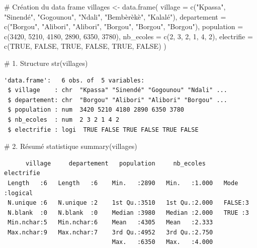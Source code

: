 \documentclass[
  french,
  11pt,
  a4paper,
]{article}
\newenvironment{Shaded}{}{}
\newcommand{\AttributeTok}[1]{\textcolor[rgb]{0.84,0.23,0.29}{#1}}
\newcommand{\CommentTok}[1]{\textcolor[rgb]{0.42,0.45,0.49}{#1}}
\newcommand{\ConstantTok}[1]{\textcolor[rgb]{0.00,0.36,0.77}{#1}}
\newcommand{\DecValTok}[1]{\textcolor[rgb]{0.00,0.36,0.77}{#1}}
\newcommand{\FunctionTok}[1]{\textcolor[rgb]{0.44,0.26,0.76}{#1}}
\newcommand{\NormalTok}[1]{\textcolor[rgb]{0.14,0.16,0.18}{#1}}
\newcommand{\OtherTok}[1]{\textcolor[rgb]{0.44,0.26,0.76}{#1}}
\newcommand{\StringTok}[1]{\textcolor[rgb]{0.01,0.18,0.38}{#1}}
\begin{document}
\begin{Shaded}
\begin{Highlighting}[]
\CommentTok{\# Création du data frame}
\NormalTok{villages }\OtherTok{\textless{}{-}} \FunctionTok{data.frame}\NormalTok{(}
  \AttributeTok{village =} \FunctionTok{c}\NormalTok{(}\StringTok{"Kpassa"}\NormalTok{, }\StringTok{"Sinendé"}\NormalTok{, }\StringTok{"Gogounou"}\NormalTok{, }\StringTok{"Ndali"}\NormalTok{, }\StringTok{"Bembèrèkè"}\NormalTok{, }\StringTok{"Kalalé"}\NormalTok{),}
  \AttributeTok{departement =} \FunctionTok{c}\NormalTok{(}\StringTok{"Borgou"}\NormalTok{, }\StringTok{"Alibori"}\NormalTok{, }\StringTok{"Alibori"}\NormalTok{, }\StringTok{"Borgou"}\NormalTok{, }\StringTok{"Borgou"}\NormalTok{, }\StringTok{"Borgou"}\NormalTok{),}
  \AttributeTok{population =} \FunctionTok{c}\NormalTok{(}\DecValTok{3420}\NormalTok{, }\DecValTok{5210}\NormalTok{, }\DecValTok{4180}\NormalTok{, }\DecValTok{2890}\NormalTok{, }\DecValTok{6350}\NormalTok{, }\DecValTok{3780}\NormalTok{),}
  \AttributeTok{nb\_ecoles =} \FunctionTok{c}\NormalTok{(}\DecValTok{2}\NormalTok{, }\DecValTok{3}\NormalTok{, }\DecValTok{2}\NormalTok{, }\DecValTok{1}\NormalTok{, }\DecValTok{4}\NormalTok{, }\DecValTok{2}\NormalTok{),}
  \AttributeTok{electrifie =} \FunctionTok{c}\NormalTok{(}\ConstantTok{TRUE}\NormalTok{, }\ConstantTok{FALSE}\NormalTok{, }\ConstantTok{TRUE}\NormalTok{, }\ConstantTok{FALSE}\NormalTok{, }\ConstantTok{TRUE}\NormalTok{, }\ConstantTok{FALSE}\NormalTok{)}
\NormalTok{)}

\CommentTok{\# 1. Structure}
\FunctionTok{str}\NormalTok{(villages)}
\end{Highlighting}
\end{Shaded}

\begin{verbatim}
'data.frame':   6 obs. of  5 variables:
 $ village    : chr  "Kpassa" "Sinendé" "Gogounou" "Ndali" ...
 $ departement: chr  "Borgou" "Alibori" "Alibori" "Borgou" ...
 $ population : num  3420 5210 4180 2890 6350 3780
 $ nb_ecoles  : num  2 3 2 1 4 2
 $ electrifie : logi  TRUE FALSE TRUE FALSE TRUE FALSE
\end{verbatim}

\begin{Shaded}
\begin{Highlighting}[]
\CommentTok{\# 2. Résumé statistique}
\FunctionTok{summary}\NormalTok{(villages)}
\end{Highlighting}
\end{Shaded}

\begin{verbatim}
      village     departement   population     nb_ecoles     electrifie     
 Length   :6   Length   :6    Min.   :2890   Min.   :1.000   Mode :logical  
 N.unique :6   N.unique :2    1st Qu.:3510   1st Qu.:2.000   FALSE:3        
 N.blank  :0   N.blank  :0    Median :3980   Median :2.000   TRUE :3        
 Min.nchar:5   Min.nchar:6    Mean   :4305   Mean   :2.333                  
 Max.nchar:9   Max.nchar:7    3rd Qu.:4952   3rd Qu.:2.750                  
                              Max.   :6350   Max.   :4.000                  
\end{verbatim}
\end{document}
